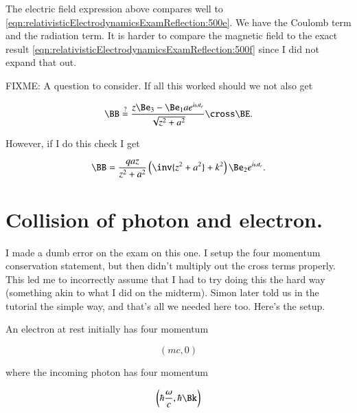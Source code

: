 The electric field expression above compares well to \ref{eqn:relativisticElectrodynamicsExamReflection:500e}.  We have the Coulomb term and the radiation term.  It is harder to compare the magnetic field to the exact result \ref{eqn:relativisticElectrodynamicsExamReflection:500f} since I did not expand that out.

FIXME: A question to consider.  If all this worked should we not also get

\begin{equation}\label{eqn:relativisticElectrodynamicsExamReflection:270}
\BB 
\stackrel{?}{=}
\frac{z \Be_3 - \Be_1 a e^{i \omega t_r}}{\sqrt{z^2 + a^2}} \cross \BE.
\end{equation}

However, if I do this check I get

\begin{equation}\label{eqn:relativisticElectrodynamicsExamReflection:290}
\BB 
=
\frac{q a z}{z^2 + a^2} \left( \inv{z^2 + a^2} + k^2 \right) \Be_2 e^{i \omega t_r}.
\end{equation}


\section{Collision of photon and electron.}

I made a dumb error on the exam on this one.  I setup the four momentum conservation statement, but then didn't multiply out the cross terms properly.  This led me to incorrectly assume that I had to try doing this the hard way (something akin to what I did on the midterm).  Simon later told us in the tutorial the simple way, and that's all we needed here too.  Here's the setup.

An electron at rest initially has four momentum

\begin{equation}\label{eqn:relativisticElectrodynamicsExamReflection:310}
(m c, 0)
\end{equation}

where the incoming photon has four momentum

\begin{equation}\label{eqn:relativisticElectrodynamicsExamReflection:330}
\left(\hbar \frac{\omega}{c}, \hbar \Bk \right)
\end{equation}


